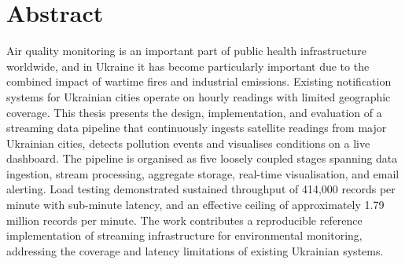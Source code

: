 \chapter*{Abstract}

Air quality monitoring is an important part of public health infrastructure worldwide, and in Ukraine it has become particularly important due to the combined impact of wartime fires and industrial emissions. Existing notification systems for Ukrainian cities operate on hourly readings with limited geographic coverage. This thesis presents the design, implementation, and evaluation of a streaming data pipeline that continuously ingests satellite readings from major Ukrainian cities, detects pollution events and visualises conditions on a live dashboard. The pipeline is organised as five loosely coupled stages spanning data ingestion, stream processing, aggregate storage, real-time visualisation, and email alerting. Load testing demonstrated sustained throughput of 414{,}000 records per minute with sub-minute latency, and an effective ceiling of approximately 1.79 million records per minute. The work contributes a reproducible reference implementation of streaming infrastructure for environmental monitoring, addressing the coverage and latency limitations of existing Ukrainian systems.
